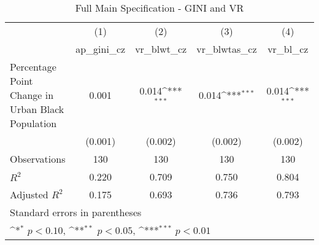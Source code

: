 \begin{table}[htbp]\centering
\def\sym#1{\ifmmode^{#1}\else\(^{#1}\)\fi}
\caption{Full Main Specification - GINI and VR}
\begin{tabular}{l*{4}{c}}
\hline\hline
                    &\multicolumn{1}{c}{(1)}&\multicolumn{1}{c}{(2)}&\multicolumn{1}{c}{(3)}&\multicolumn{1}{c}{(4)}\\
                    &\multicolumn{1}{c}{ap\_gini\_cz}&\multicolumn{1}{c}{vr\_blwt\_cz}&\multicolumn{1}{c}{vr\_blwtas\_cz}&\multicolumn{1}{c}{vr\_bl\_cz}\\
\hline
Percentage Point Change in Urban Black Population&       0.001         &       0.014\sym{***}&       0.014\sym{***}&       0.014\sym{***}\\
                    &     (0.001)         &     (0.002)         &     (0.002)         &     (0.002)         \\
\hline
Observations        &         130         &         130         &         130         &         130         \\
\(R^{2}\)           &       0.220         &       0.709         &       0.750         &       0.804         \\
Adjusted \(R^{2}\)  &       0.175         &       0.693         &       0.736         &       0.793         \\
\hline\hline
\multicolumn{5}{l}{\footnotesize Standard errors in parentheses}\\
\multicolumn{5}{l}{\footnotesize \sym{*} \(p<0.10\), \sym{**} \(p<0.05\), \sym{***} \(p<0.01\)}\\
\end{tabular}
\end{table}
